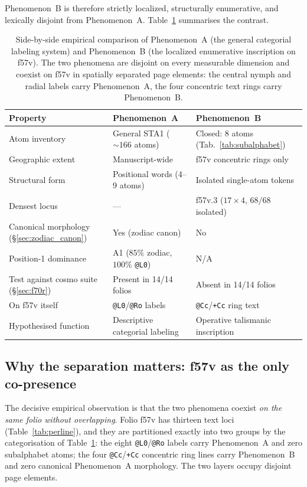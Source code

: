 Phenomenon~B is therefore strictly localized, structurally enumerative,
and lexically disjoint from Phenomenon~A. Table~\ref{tab:two_phenomena}
summarises the contrast.

\begin{table}[h]
\centering
\small
\begin{tabular}{lll}
\toprule
Property & Phenomenon~A & Phenomenon~B \\
\midrule
Atom inventory & General STA1 ($\sim 166$ atoms) & Closed: 8 atoms (Tab.~\ref{tab:subalphabet}) \\
Geographic extent & Manuscript-wide & f57v concentric rings only \\
Structural form & Positional words (4--9 atoms) & Isolated single-atom tokens \\
Densest locus & ---  & f57v.3 ($17\!\times\!4$, $68/68$ isolated) \\
Canonical morphology (\S\ref{sec:zodiac_canon}) & Yes (zodiac canon) & No \\
Position-1 dominance & A1 ($85\%$ zodiac, $100\%$ \texttt{@L0}) & N/A \\
Test against cosmo suite (\S\ref{sec:f70r}) & Present in 14/14 folios & Absent in 14/14 folios \\
On f57v itself & \texttt{@L0}/\texttt{@Ro} labels & \texttt{@Cc}/\texttt{+Cc} ring text \\
Hypothesised function & Descriptive categorial labeling & Operative talismanic inscription \\
\bottomrule
\end{tabular}
\caption{Side-by-side empirical comparison of Phenomenon~A (the general
categorial labeling system) and Phenomenon~B (the localized enumerative
inscription on f57v). The two phenomena are disjoint on every measurable
dimension and coexist on f57v in spatially separated page elements: the
central nymph and radial labels carry Phenomenon~A, the four concentric
text rings carry Phenomenon~B.}
\label{tab:two_phenomena}
\end{table}

\subsection{Why the separation matters: f57v as the only co-presence}
\label{sec:why_separation}

The decisive empirical observation is that the two phenomena coexist
\emph{on the same folio without overlapping}. Folio f57v has thirteen
text loci (Table~\ref{tab:perline}), and they are partitioned exactly
into two groups by the categorisation of Table~\ref{tab:two_phenomena}:
the eight \texttt{@L0}/\texttt{@Ro} labels carry Phenomenon~A and zero
subalphabet atoms; the four \texttt{@Cc}/\texttt{+Cc} concentric ring
lines carry Phenomenon~B and zero canonical Phenomenon~A morphology.
The two layers occupy disjoint page elements.

